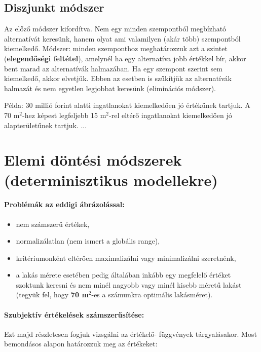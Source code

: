 \documentclass[a4paper,12pt]{article}
\begin{document}
\subsection{Diszjunkt módszer}

Az előző módszer kifordítva. Nem egy minden szempontból megbízható alternatívát keresünk, hanem olyat ami valamilyen (akár több) szempontból kiemelkedő. Módszer: minden szemponthoz meghatározzuk azt a szintet (\textbf{elegendőségi feltétel}), amelynél ha egy alternatíva jobb értékkel bír, akkor bent marad az alternatívák halmazában. Ha egy szempont szerint sem kiemelkedő, akkor elvetjük. Ebben az esetben is szűkítjük az alternatívák halmazát és nem egyetlen legjobbat keresünk (eliminációs módszer).

Példa: 30 millió forint alatti ingatlanokat kiemelkedően jó értékűnek tartjuk. A 70 m$^2$-hez képest legfeljebb 15 m$^2$-rel eltérő ingatlanokat kiemelkedően jó alapterületűnek tartjuk. ...


\section{Elemi döntési módszerek (determinisztikus modellekre)}

\paragraph{Problémák az eddigi ábrázolással:}
\begin{itemize}
\item nem számszerű értékek,
\item normalizálatlan (nem ismert a globális range),
\item kritériumonként eltérően maximalizálni vagy minimalizálni szeretnénk, 
\item a lakás mérete esetében pedig általában inkább egy megfelelő értéket szoktunk keresni és nem minél nagyobb vagy minél kisebb méretű lakást (tegyük fel, hogy \textbf{70 m$^2$}-es a számunkra optimális lakásméret).
\end{itemize}
\paragraph{Szubjektív értékelések számszerűsítése:}

Ezt majd részletesen fogjuk vizsgálni az értékelő- függvények tárgyalásakor. Most bemondásos alapon határozzuk meg az értékeket:
\end{document}
